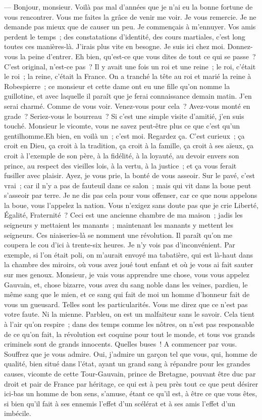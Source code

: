 \documentclass[french,twoside]{book} %
\begin{document}
— Bonjour, monsieur. Voilà pas mal d’années que je n’ai eu la bonne fortune de vous rencontrer. Vous me faites la grâce de venir me voir. Je vous remercie. Je ne demande pas mieux que de causer un peu. Je commençais à m’ennuyer. Vos amis perdent le temps ; des constatations d’identité, des cours martiales, c’est long toutes ces manières-là. J’irais plus vite en besogne. Je suis ici chez moi. Donnez-vous la peine d’entrer. Eh bien, qu’est-ce que vous dites de tout ce qui se passe ? C’est original, n’est-ce pas ? Il y avait une fois un roi et une reine ; le roi, c’était le roi ; la reine, c’était la France. On a tranché la tête au roi et marié la reine à Robespierre ; ce monsieur et cette dame ont eu une fille qu’on nomme la guillotine, et avec laquelle il paraît que je ferai connaissance demain matin. J’en serai charmé. Comme de vous voir. Venez-vous pour cela ? Avez-vous monté en grade ? Seriez-vous le bourreau ? Si c’est une simple visite d’amitié, j’en suis touché. Monsieur le vicomte, vous ne savez peut-être plus ce que c’est qu’un gentilhomme.Eh bien, en voilà un ; c’est moi. Regardez ça. C’est curieux ; ça croit en Dieu, ça croit à la tradition, ça croit à la famille, ça croit à ses aïeux, ça croit à l’exemple de son père, à la fidélité, à la loyauté, au devoir envers son prince, au respect des vieilles lois, à la vertu, à la justice ; et ça vous ferait fusiller avec plaisir. Ayez, je vous prie, la bonté de vous asseoir. Sur le pavé, c’est vrai ; car il  n’y a pas de fauteuil dans ce salon ; mais qui vit dans la boue peut s’asseoir par terre. Je ne dis pas cela pour vous offenser, car ce que nous appelons la boue, vous l’appelez la nation. Vous n’exigez sans doute pas que je crie Liberté, Égalité, Fraternité ? Ceci est une ancienne chambre de ma maison ; jadis les seigneurs y mettaient les manants ; maintenant les manants y mettent les seigneurs. Ces niaiseries-là se nomment une révolution. Il paraît qu’on me coupera le cou d’ici à trente-six heures. Je n’y vois pas d’inconvénient. Par exemple, si l’on était poli, on m’aurait envoyé ma tabatière, qui est là-haut dans la chambre des miroirs, où vous avez joué tout enfant et où je vous ai fait sauter sur mes genoux. Monsieur, je vais vous apprendre une chose, vous vous appelez Gauvain, et, chose bizarre, vous avez du sang noble dans les veines, pardieu, le même sang que le mien, et ce sang qui fait de moi un homme d’honneur fait de vous un gueusard. Telles sont les particularités. Vous me direz que ce n’est pas votre faute. Ni la mienne. Parbleu, on est un malfaiteur sans le savoir. Cela tient à l’air qu’on respire ; dans des temps comme les nôtres, on n’est pas responsable de ce qu’on fait, la révolution est coquine pour tout le monde, et tous vos grands criminels sont de grands innocents. Quelles buses ! A commencer par vous. Souffrez que je vous admire. Oui, j’admire un garçon tel que vous, qui, homme de qualité, bien situé dans l’état, ayant un grand sang à répandre pour les grandes causes, vicomte de cette Tour-Gauvain, prince de Bretagne, pouvant être duc par  droit et pair de France par héritage, ce qui est à peu près tout ce que peut désirer ici-bas un homme de bon sens, s’amuse, étant ce qu’il est, à être ce que vous êtes, si bien qu’il fait à ses ennemis l’effet d’un scélérat et à ses amis l’effet d’un imbécile. 
\end{document}
